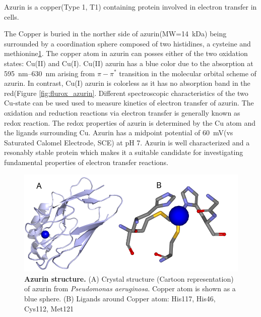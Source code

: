 \documentclass[11pt,a4paper,onecolumn]{article}
\begin{document}
Azurin is a copper(Type 1, T1) containing protein involved in electron transfer in cells.\cite{dennison2005investigating,kolczak2006handbook}

The Copper is buried in the norther side of azurin(MW=\SI{14}{\kilo\dalton}) being surrounded by a coordination sphere composed of two histidines, a cysteine and methionine\ref{fig:azurin_structure}.
The copper atom in azurin can posses either of the two oxidation states: Cu(II) and Cu(I).
Cu(II) azurin has a blue color due to the absorption at \SIrange{595}{630}{\nm} arising from $\pi - \pi^*$ transition in the molecular orbital scheme of azurin.\cite{dooley1981spectroscopic,schmauder2005sensitive}
In contrast, Cu(I) azurin is colorless as it has no absorption band in the red(Figure \ref{fig:flurox_azurin}.
Different spectroscopic characteristics of the two Cu-state can be used used to measure kinetics of electron transfer of azurin.
The oxidation and reduction reactions via electron transfer is generally known as redox reaction.
The redox properties of azurin is determined by the Cu atom and the ligands surrounding Cu.
Azurin has a midpoint potential of \SI{60}{\mV}(vs Saturated Calomel Electrode, SCE) at pH 7.
Azurin is well characterized and a resonably stable protein which makes it a suitable candidate for investigating fundamental properties of electron transfer reactions.
\begin{figure}
	\centering
	\includegraphics[width=\textwidth]{azurin_structure}
	\caption{\textbf{Azurin structure.} (A) Crystal structure (Cartoon representation) of azurin from \textit{Pseudomonas aeruginosa}.\cite{adman1981structural}
	Copper atom is shown as a blue sphere.
	(B) Ligands around Copper atom: His117, His46, Cys112, Met121}
	\label{fig:azurin_structure}
\end{figure}
\end{document}

